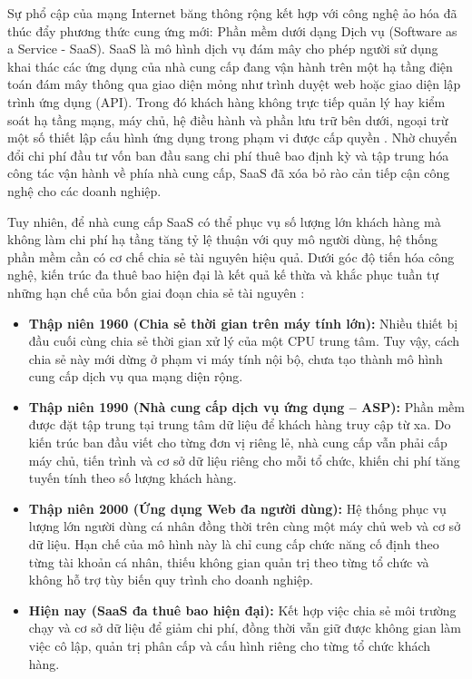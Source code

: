 Sự phổ cập của mạng Internet băng thông rộng kết hợp với công nghệ ảo hóa đã thúc đẩy phương thức cung ứng mới: Phần mềm dưới dạng Dịch vụ (Software as a Service - SaaS). SaaS là mô hình dịch vụ đám mây cho phép người sử dụng khai thác các ứng dụng của nhà cung cấp đang vận hành trên một hạ tầng điện toán đám mây thông qua giao diện mỏng như trình duyệt web hoặc giao diện lập trình ứng dụng (API). Trong đó khách hàng không trực tiếp quản lý hay kiểm soát hạ tầng mạng, máy chủ, hệ điều hành và phần lưu trữ bên dưới, ngoại trừ một số thiết lập cấu hình ứng dụng trong phạm vi được cấp quyền \cite{v4-14}. Nhờ chuyển đổi chi phí đầu tư vốn ban đầu sang chi phí thuê bao định kỳ và tập trung hóa công tác vận hành về phía nhà cung cấp, SaaS đã xóa bỏ rào cản tiếp cận công nghệ cho các doanh nghiệp.

Tuy nhiên, để nhà cung cấp SaaS có thể phục vụ số lượng lớn khách hàng mà không làm chi phí hạ tầng tăng tỷ lệ thuận với quy mô người dùng, hệ thống phần mềm cần có cơ chế chia sẻ tài nguyên hiệu quả. Dưới góc độ tiến hóa công nghệ, kiến trúc đa thuê bao hiện đại là kết quả kế thừa và khắc phục tuần tự những hạn chế của bốn giai đoạn chia sẻ tài nguyên \cite{v4-05}:

\begin{itemize}
\item
  \textbf{Thập niên 1960 (Chia sẻ thời gian trên máy tính lớn):} Nhiều thiết bị đầu cuối cùng chia sẻ thời gian xử lý của một CPU trung tâm. Tuy vậy, cách chia sẻ này mới dừng ở phạm vi máy tính nội bộ, chưa tạo thành mô hình cung cấp dịch vụ qua mạng diện rộng.
\item
  \textbf{Thập niên 1990 (Nhà cung cấp dịch vụ ứng dụng -- ASP):} Phần mềm được đặt tập trung tại trung tâm dữ liệu để khách hàng truy cập từ xa. Do kiến trúc ban đầu viết cho từng đơn vị riêng lẻ, nhà cung cấp vẫn phải cấp máy chủ, tiến trình và cơ sở dữ liệu riêng cho mỗi tổ chức, khiến chi phí tăng tuyến tính theo số lượng khách hàng.
\item
  \textbf{Thập niên 2000 (Ứng dụng Web đa người dùng):} Hệ thống phục vụ lượng lớn người dùng cá nhân đồng thời trên cùng một máy chủ web và cơ sở dữ liệu. Hạn chế của mô hình này là chỉ cung cấp chức năng cố định theo từng tài khoản cá nhân, thiếu không gian quản trị theo từng tổ chức và không hỗ trợ tùy biến quy trình cho doanh nghiệp.
\item
  \textbf{Hiện nay (SaaS đa thuê bao hiện đại):} Kết hợp việc chia sẻ môi trường chạy và cơ sở dữ liệu để giảm chi phí, đồng thời vẫn giữ được không gian làm việc cô lập, quản trị phân cấp và cấu hình riêng cho từng tổ chức khách hàng.
\end{itemize}

